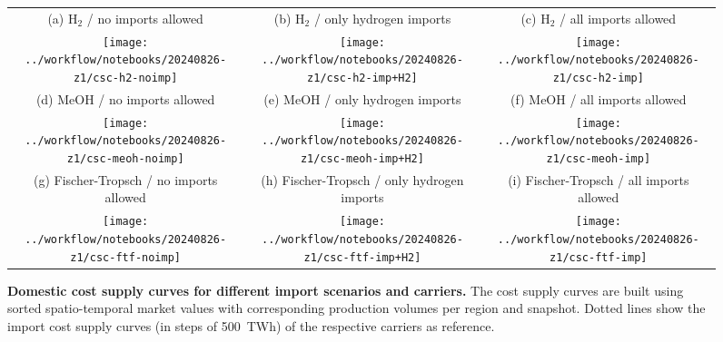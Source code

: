 \begin{figure*}
    \footnotesize
    \begin{tabular}{ccc}
        (a) H$_2$ / no imports allowed & (b) H$_2$ / only hydrogen imports & (c) H$_2$ / all imports allowed \\
        \texttt{[image: ../workflow/notebooks/20240826-z1/csc-h2-noimp]} &
        \texttt{[image: ../workflow/notebooks/20240826-z1/csc-h2-imp+H2]} &
        \texttt{[image: ../workflow/notebooks/20240826-z1/csc-h2-imp]} \\
        (d) MeOH / no imports allowed & (e) MeOH / only hydrogen imports & (f) MeOH / all imports allowed \\
        \texttt{[image: ../workflow/notebooks/20240826-z1/csc-meoh-noimp]} &
        \texttt{[image: ../workflow/notebooks/20240826-z1/csc-meoh-imp+H2]} &
        \texttt{[image: ../workflow/notebooks/20240826-z1/csc-meoh-imp]} \\
        (g) Fischer-Tropsch / no imports allowed & (h) Fischer-Tropsch / only hydrogen imports & (i) Fischer-Tropsch / all imports allowed \\
        \texttt{[image: ../workflow/notebooks/20240826-z1/csc-ftf-noimp]} &
        \texttt{[image: ../workflow/notebooks/20240826-z1/csc-ftf-imp+H2]} &
        \texttt{[image: ../workflow/notebooks/20240826-z1/csc-ftf-imp]} \\
    \end{tabular}
    \caption{\textbf{Domestic cost supply curves for different import scenarios and carriers.}
        The cost supply curves are built using sorted spatio-temporal market
        values with corresponding production volumes per region and snapshot.
        Dotted lines show the import cost supply curves (in steps of 500~TWh) of
        the respective carriers as reference.}
    \label{fig:si:cost-supply-curves}
\end{figure*}

